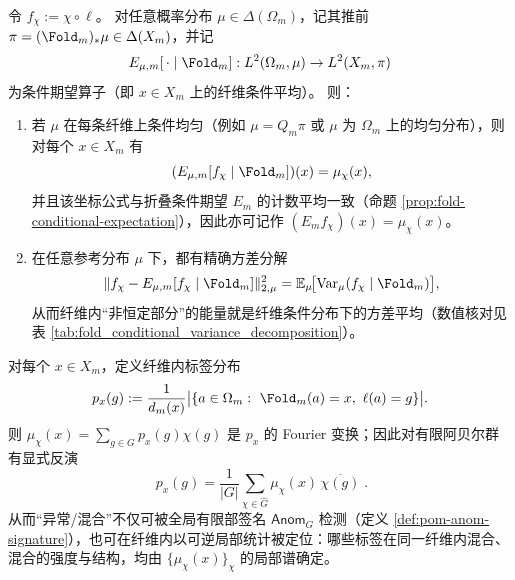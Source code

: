 \begin{proposition}\label{prop:pom-fiber-fourier-variance}
令 \(f_\chi:=\chi\circ \ell\)。
对任意概率分布 \(\mu\in\Delta(\Omega_m)\)，记其推前 \(\pi=(\Fold_m)_*\mu\in\Delta(X_m)\)，并记
\[
E_{\mu,m}[\,\cdot\mid\Fold_m]:L^2(\Omega_m,\mu)\to L^2(X_m,\pi)
\]
为条件期望算子（即 \(x\in X_m\) 上的纤维条件平均）。
则：
\begin{enumerate}
  \item 若 \(\mu\) 在每条纤维上条件均匀（例如 \(\mu=Q_m\pi\) 或 \(\mu\) 为 \(\Omega_m\) 上的均匀分布），则对每个 \(x\in X_m\) 有
  \[
  (E_{\mu,m}[f_\chi\mid\Fold_m])(x)=\mu_\chi(x),
  \]
  并且该坐标公式与折叠条件期望 \(E_m\) 的计数平均一致（命题 \ref{prop:fold-conditional-expectation}），因此亦可记作 \((E_m f_\chi)(x)=\mu_\chi(x)\)。
  \item 在任意参考分布 \(\mu\) 下，都有精确方差分解
  $$
  \|f_\chi-E_{\mu,m}[f_\chi\mid\Fold_m]\|_{2,\mu}^2
  =
  \mathbb{E}_\mu\!\big[\mathrm{Var}_\mu(f_\chi\mid \Fold_m)\big],
  $$
  从而纤维内“非恒定部分”的能量就是纤维条件分布下的方差平均（数值核对见表 \ref{tab:fold_conditional_variance_decomposition}）。
\end{enumerate}
\end{proposition}


\begin{corollary}[纤维内标签分布的可逆重构]\label{cor:pom-fiber-label-distribution-inversion}
对每个 \(x\in X_m\)，定义纤维内标签分布
$$
p_x(g):=\frac{1}{d_m(x)}\bigl|\{a\in\Omega_m:\ \Fold_m(a)=x,\ \ell(a)=g\}\bigr|.
$$
则 \(\mu_\chi(x)=\sum_{g\in G}p_x(g)\chi(g)\) 是 \(p_x\) 的 Fourier 变换；因此对有限阿贝尔群有显式反演
$$
\boxed{\;
p_x(g)=\frac{1}{|G|}\sum_{\chi\in\widehat G}\mu_\chi(x)\,\overline{\chi(g)}\; }.
$$
从而“异常/混合”不仅可被全局有限部签名 \(\mathsf{Anom}_G\) 检测（定义 \ref{def:pom-anom-signature}），也可在纤维内以可逆局部统计被定位：哪些标签在同一纤维内混合、混合的强度与结构，均由 \(\{\mu_\chi(x)\}_{\chi}\) 的局部谱确定。
\end{corollary}

